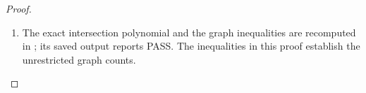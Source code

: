 \begin{proof}
\begin{enumerate}[label={$\langle1\rangle$\arabic*.},leftmargin=*]
\paragraph{The degree-three genus contradiction.}
For the now smooth curve $A=\mathbb P^1$, adjunction gives
$\deg N_{A/Y}=-2$, so $E=N_{A/Y}^*$ has degree two.
The actual cubic has at least two common zeros. Its residual
spectral divisor is $3\xi-bF$ with $b\ge2$, and is
irreducible with normalization $H$. Formula (4.55d) gives
\[
                    p_a(\Gamma)=4-2b\le0,
\]
contradicting $p_a(\Gamma)\ge g\ge1$. Degree three is
excluded. The degree-two alternative and its unique rational
third sheet are precisely the possibilities already identified
by the spectral morphism above.

\item The exact intersection polynomial and the graph inequalities
are recomputed in
; its saved output
reports PASS. The inequalities in this proof establish the
unrestricted graph counts.

\end{enumerate}
\end{proof}
